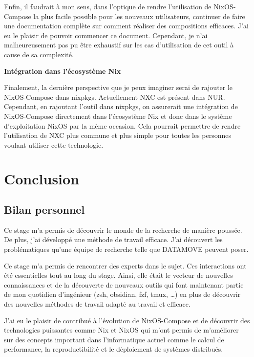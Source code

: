 \documentclass[a4paper,french,12pt, titlepage]{article}
\begin{document}
Enfin, il faudrait à mon sens, dans l'optique de rendre l'utilisation de
NixOS-Compose la plus facile possible pour les nouveaux utilisateurs,
continuer de faire une documentation complète sur comment réaliser des
compositions efficaces. J'ai eu le plaisir de pouvoir commencer ce
document. Cependant, je n'ai malheureusement pas pu être exhaustif sur
les cas d'utilisation de cet outil à cause de sa complexité.\newline

\textbf{Intégration dans l'écosystème Nix}\newline

Finalement, la dernière perspective que je peux imaginer serai de
rajouter le NixOS-Compose dans nixpkgs. Actuellement NXC est présent
dans NUR. Cependant, en rajoutant l'outil dans nixpkgs, on assurerait
une intégration de NixOS-Compose directement dans l'écosystème Nix et
donc dans le système d'exploitation NixOS par la même occasion. Cela
pourrait permettre de rendre l'utilisation de NXC plus commune et plus
simple pour toutes les personnes voulant utiliser cette
technologie.\newline

\newpage

\hypertarget{conclusion}{%
\section{Conclusion}\label{conclusion}}

\hypertarget{bilan-personnel}{%
\subsection{Bilan personnel}\label{bilan-personnel}}

Ce stage m'a permis de découvrir le monde de la recherche de manière
poussée. De plus, j'ai développé une méthode de travail efficace. J'ai
découvert les problématiques qu'une équipe de recherche telle que
DATAMOVE peuvent poser.

Ce stage m'a permis de rencontrer des experts dans le sujet. Ces
interactions ont été essentielles tout au long du stage. Ainsi, elle
était le vecteur de nouvelles connaissances et de la découverte de
nouveaux outils qui font maintenant partie de mon quotidien d'ingénieur
(zsh, obsidian, fzf, tmux, \ldots) en plus de découvrir des nouvelles
méthodes de travail adapté au travail et efficace.

J'ai eu le plaisir de contribué à l'évolution de NixOS-Compose et de
découvrir des technologies puissantes comme Nix et NixOS qui m'ont
permis de m'améliorer sur des concepts important dans l'informatique
actuel comme le calcul de performance, la reproductibilité et le
déploiement de systèmes distribués.\newline
\end{document}
